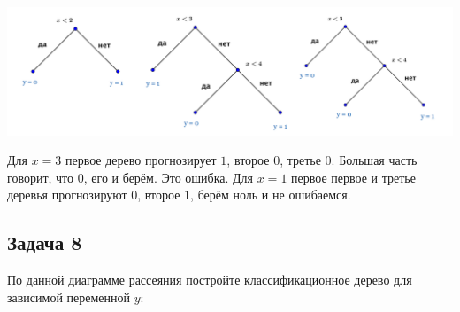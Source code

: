\documentclass[12pt, a4paper, oneside]{article}
\begin{document}
{\begin{enumerate}
		
		\begin{center}
			\includegraphics[scale=0.17]{forest.png}
		\end{center} 	
		
		Для $x=3$ первое дерево прогнозирует $1$, второе $0$, третье $0$. Большая часть говорит, что $0$, его и берём. Это ошибка. Для $x=1$ первое первое и третье деревья прогнозируют $0$, второе $1$, берём ноль и не ошибаемся. 
	\end{enumerate}
	
}


\subsection*{Задача 8}

По данной диаграмме рассеяния постройте классификационное дерево для зависимой переменной $y$:

\begin{center}
	\begin{tikzpicture}[scale = 0.015]
	
	\end{tikzpicture}
\end{center}
\end{document}
